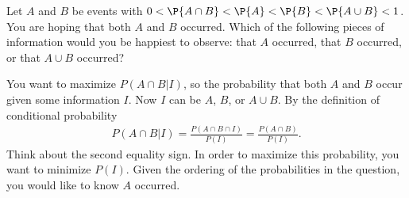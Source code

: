 

\setcounter{theorem}{10}

\begin{exercise}[BH.2.15]
Let $A$ and $B$ be events with $0 < \P{A \cap B} < \P{A} < \P{B} < \P{A \cup B} < 1$. You are hoping that both $A$ and $B$ occurred. Which of the following pieces of information would you be happiest to observe: that $A$ occurred, that $B$ occurred, or that $A \cup B$ occurred?
\begin{solution}
	You want to maximize $P(A\cap B|I)$, so the probability that both $A$ and $B$ occur given some information $I$. Now $I$ can be $A$, $B$, or $A\cup B$. By the definition of conditional probability
	\begin{align*}
		P(A\cap B|I) =\frac{P(A\cap B\cap I)}{P(I)} = \frac{P(A\cap B)}{P(I)}.
	\end{align*}
	Think about the second equality sign. In order to maximize this probability, you want to minimize $P(I)$. Given the ordering of the probabilities in the question, you would like to know $A$ occurred.	
\end{solution}
\end{exercise}


